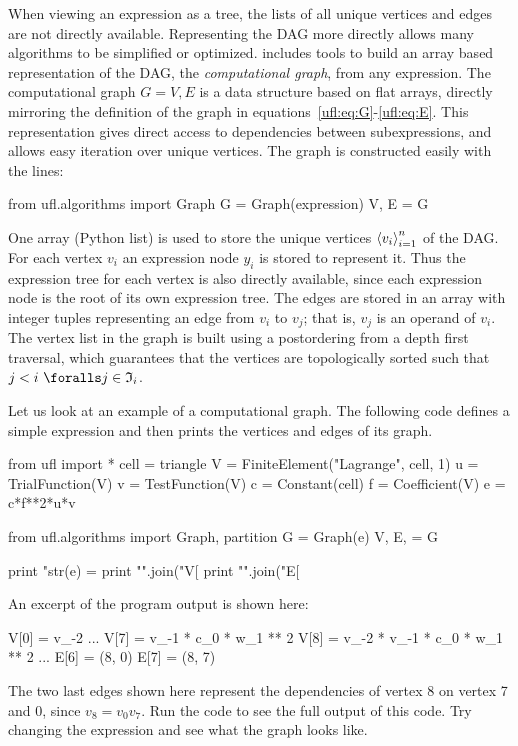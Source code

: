 When viewing an expression as a tree, the lists of all unique
vertices and edges are not directly available. Representing the DAG
more directly allows many algorithms to be simplified or optimized.
\ufl{} includes tools to build an array based representation of
the DAG, the \emph{computational graph}, from any expression.
The computational graph $G = V, E$ is a data structure based on
flat arrays, directly mirroring the definition of the graph in
equations~\eqref{ufl:eq:G}-\eqref{ufl:eq:E}.  This representation gives
direct access to dependencies between subexpressions, and allows easy
iteration over unique vertices.  The graph is constructed easily with
the lines:
\begin{python}
from ufl.algorithms import Graph
G = Graph(expression)
V, E = G
\end{python}
One array (Python list)
 is used to store the unique vertices $\left\langle{v_i}\right\rangle_{i=1}^n$ of the
DAG.  For each vertex $v_i$ an expression node $y_i$ is stored to
represent it.  Thus the expression tree for each vertex is also
directly available, since each expression node is the root of its own
expression tree. The edges are stored in an array  with
integer tuples  representing an edge from $v_i$ to $v_j$;
that is, $v_j$ is an operand of $v_i$.  The vertex list in the graph
is built using a postordering from a depth first traversal,
which guarantees that the vertices are topologically sorted
such that $j < i \,\, \foralls j \in \mI_i$.

Let us look at an example of a computational graph. The following code
defines a simple expression and then prints the vertices and edges
of its graph.
\begin{python}
from ufl import *
cell = triangle
V = FiniteElement("Lagrange", cell, 1)
u = TrialFunction(V)
v = TestFunction(V)
c = Constant(cell)
f = Coefficient(V)
e = c*f**2*u*v

from ufl.algorithms import Graph, partition
G = Graph(e)
V, E, = G

print "str(e) = %
print "\n".join("V[%
print "\n".join("E[%
\end{python}
An excerpt of the program output is shown here:
\begin{gencode}
V[0] = v_{-2}
...
V[7] = v_{-1} * c_0 * w_1 ** 2
V[8] = v_{-2} * v_{-1} * c_0 * w_1 ** 2
...
E[6] = (8, 0)
E[7] = (8, 7)
\end{gencode}
The two last edges shown here represent the dependencies of vertex 8
on vertex 7 and 0, since $v_8 = v_0 v_7$. Run the code to see the full
output of this code.  Try changing the expression and see what the
graph looks like.

